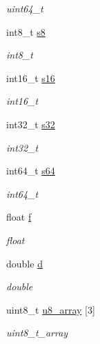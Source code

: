 \begin{DoxyCompactItemize}
\begin{DoxyCompactList}\small\item\em uint64\+\_\+t \end{DoxyCompactList}\item 
int8\+\_\+t \mbox{\hyperlink{struct____mavlink__test__types__t_af79bccd496f740e1f9e80e084f6c3e0e}{s8}}
\begin{DoxyCompactList}\small\item\em int8\+\_\+t \end{DoxyCompactList}\item 
int16\+\_\+t \mbox{\hyperlink{struct____mavlink__test__types__t_a6ab0cae6642964ca13fbf64709b164d0}{s16}}
\begin{DoxyCompactList}\small\item\em int16\+\_\+t \end{DoxyCompactList}\item 
int32\+\_\+t \mbox{\hyperlink{struct____mavlink__test__types__t_a709e0bb2dcda0c35fca9aa1d50ea7ccf}{s32}}
\begin{DoxyCompactList}\small\item\em int32\+\_\+t \end{DoxyCompactList}\item 
int64\+\_\+t \mbox{\hyperlink{struct____mavlink__test__types__t_a98e07434b0458d455d1bcf634b5c80e1}{s64}}
\begin{DoxyCompactList}\small\item\em int64\+\_\+t \end{DoxyCompactList}\item 
float \mbox{\hyperlink{struct____mavlink__test__types__t_ac9b429bd7a2999f549f6d41a30daae0a}{f}}
\begin{DoxyCompactList}\small\item\em float \end{DoxyCompactList}\item 
double \mbox{\hyperlink{struct____mavlink__test__types__t_a12ac797d1a0b3e329000fe19bcafb992}{d}}
\begin{DoxyCompactList}\small\item\em double \end{DoxyCompactList}\item 
uint8\+\_\+t \mbox{\hyperlink{struct____mavlink__test__types__t_aa9e9f7fbdae69fb84fa7c85c1af20ba7}{u8\+\_\+array}} \mbox{[}3\mbox{]}
\begin{DoxyCompactList}\small\item\em uint8\+\_\+t\+\_\+array \end{DoxyCompactList}\item 

\end{DoxyCompactItemize}
